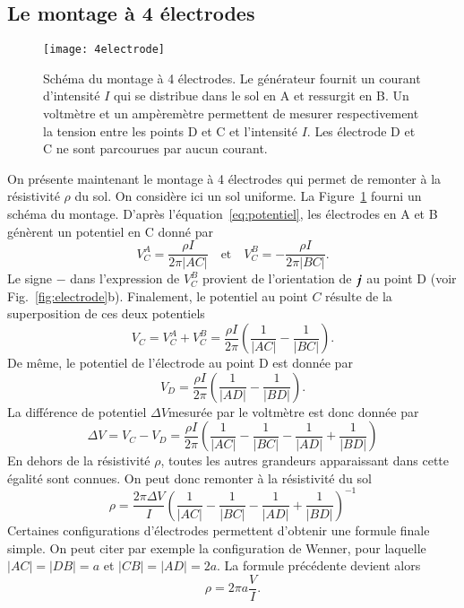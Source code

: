 \subsection{Le montage à 4 électrodes}
\begin{figure}[]
	\centering
	\texttt{[image: 4electrode]}
	\caption{Schéma du montage à 4 électrodes. Le générateur fournit un courant
		 d'intensité $I$ qui se distribue dans le sol en A et ressurgit en 
	 	 B. Un voltmètre et un ampèremètre permettent de mesurer respectivement
		 la tension
	 	 entre les points D et C et l'intensité $I$. Les électrode D
	 	 et C ne sont parcourues par aucun courant.}%
	\label{fig:4electrode}
\end{figure}
On présente maintenant le montage à 4 électrodes qui permet de remonter à la 
résistivité $\rho$ du sol. On considère ici un sol uniforme.
La Figure~\ref{fig:4electrode} fourni un schéma 
du montage. D'après l'équation~\ref{eq:potentiel}, les électrodes en A et B 
génèrent un potentiel en C donné par
\begin{equation*}
	V_C^A = \dfrac{\rho I}{2 \pi |AC|} \quad \mathrm{et} \quad
	V_C^B = -\dfrac{\rho I}{2 \pi |BC|}.
\end{equation*}
Le signe $-$ dans l'expression de $V_C^B$ provient de l'orientation de $\vecj$ 
au point D (voir Fig.~\ref{fig:electrode}b). Finalement, le potentiel au point $C$
résulte de la superposition de ces deux potentiels
\begin{equation*}
	V_C = V_C^A + V_C^B = \dfrac{\rho I}{2 \pi}
	                    \left(\dfrac{1}{|AC|} - \dfrac{1}{|BC|}\right).
\end{equation*}
De même, le potentiel de l'électrode au point D est donnée par
\begin{equation*}
	V_D = \dfrac{\rho I}{2 \pi}
	      \left(\dfrac{1}{|AD|} - \dfrac{1}{|BD|}\right).
\end{equation*}
La différence de potentiel $\Delta V$mesurée par le voltmètre est donc donnée par 
\begin{equation*}
	\Delta V = V_C - V_D = \dfrac{\rho I}{2 \pi}\left(
		\dfrac{1}{|AC|} - \dfrac{1}{|BC|}
	- \dfrac{1}{|AD|} + \dfrac{1}{|BD|} \right)
\end{equation*}
En dehors de la résistivité $\rho$, toutes les autres grandeurs apparaissant dans
cette égalité sont connues. On peut donc remonter à la résistivité du sol
\begin{equation}
	\rho = \dfrac{2 \pi \Delta V}{I}\left(
		\dfrac{1}{|AC|} - \dfrac{1}{|BC|}
	- \dfrac{1}{|AD|} + \dfrac{1}{|BD|} \right)^{-1}
\end{equation}
Certaines configurations d'électrodes permettent d'obtenir une formule finale
simple. On peut citer par exemple la configuration de Wenner, pour laquelle
$|AC| = |DB| = a$ et $|CB| = |AD| = 2a$. La formule précédente devient alors
\begin{equation}
	\rho = 2 \pi a \dfrac{V}{I}.
\end{equation}

